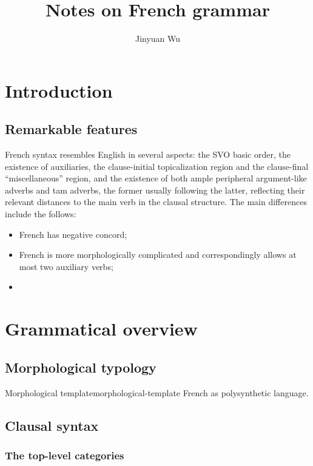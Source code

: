 \documentclass[a4paper, oneside, 12pt]{report}
\title{Notes on French grammar}
\author{Jinyuan Wu}
\begin{document}
\automath

\maketitle

\chapter{Introduction}

\section{Remarkable features}

French syntax resembles English in several aspects:
the SVO basic order,
the existence of auxiliaries, 
the clause-initial topicalization region and 
the clause-final ``miscellaneous'' region, 
and the existence of both ample peripheral argument-like adverbs 
and \ac{tam} adverbs, 
the former usually following the latter, 
reflecting their relevant distances to the main verb in the clausal structure.
The main differences include the follows:
\begin{itemize}
    \item French has negative concord;
    \item French is more morphologically complicated 
    and correspondingly allows at most two auxiliary verbs;
    \item 
\end{itemize}

\chapter{Grammatical overview}

\section{Morphological typology}

\begin{todobox}{Morphological template}{morphological-template}
    French as polysynthetic language.
\end{todobox}

\section{Clausal syntax}

\subsection{The top-level categories}
\end{document}
